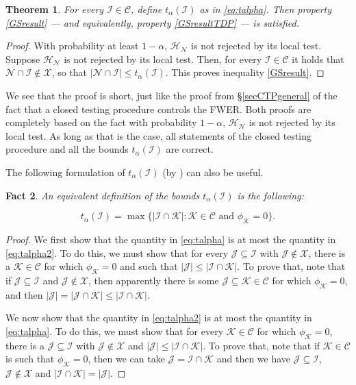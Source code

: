 \documentclass[11pt]{article}
\theoremstyle{plain}
\newtheorem{theorem}{Theorem}[section]
\newtheorem{fact}[theorem]{Fact}
\theoremstyle{definition}
\newcommand{\N}{\mathcal{N}}
\newcommand{\K}{\mathcal{K}}
\newcommand{\I}{\mathcal{I}}
\newcommand{\J}{\mathcal{J}}
\newcommand{\X}{\mathcal{X}}
\newcommand{\C}{\mathcal{C}}
\newcommand{\Hy}{\mathcal{H}}
\begin{document}
\begin{theorem}\label{thmsimCTPbounds}
For every $\I\in \C$, define $t_{\alpha}(\I)$ as in \eqref{eq:talpha}. Then property \eqref{GSresult} --- and equivalently, property \eqref{GSresultTDP} --- is satisfied.
\end{theorem}
\begin{proof}
With probability at least $1-\alpha$, $\Hy_{\N}$ is not rejected by its local test. Suppose $\Hy_{\N}$ is not rejected by its local test. Then,  for every $\I \in \C$ it holds that $\N\cap \I\not\in \X$, so that $|\N\cap \I| \leq t_{\alpha}(\I)$. This proves inequality \eqref{GSresult}.
\end{proof}
We see that the proof is  short, just like the proof from \S\ref{secCTPgeneral} of the fact that a closed testing procedure controls the FWER. Both proofs are completely based on the fact with probability $1-\alpha$, $\Hy_{\N}$ is not rejected by its local test. As long as that is the case, all statements of the closed testing procedure and all the bounds $t_{\alpha}(\I)$ are correct. 

The following formulation of $t_{\alpha}(\I)$ (by \citealp{genovese2006exceedance}) can also be useful.

\begin{fact} \label{altformtalpha}
An equivalent  definition of the bounds $t_{\alpha}(\I)$ is the following:
\end{fact}
\vspace{-0.4cm}
\begin{equation} \label{eq:talpha2} 
t_{\alpha}(\I)=\max\{|\I\cap \K|: \K\in\C  \text{ and }\phi_{\K}=0\}.
\end{equation}
\begin{proof}
We first show that the quantity in    \eqref{eq:talpha} is at most the quantity in    \eqref{eq:talpha2}. To do this, we must show that for every $ \J \subseteq \I$ with $ \J\not\in \X$, there is a $\K\in \C$ for which $\phi_{\K}=0$ and such that $|\J|  \leq  |\I\cap \K|$.
To prove that, note that if $ \J \subseteq \I$ and $ \J\not\in \X$, then apparently there is some $ \J\subseteq \K\in \C$ for which $\phi_{\K}=0$, and then $|\J| =|\J\cap \K| \leq  |\I\cap \K|$. 

We now  show that the quantity in    \eqref{eq:talpha2} is at most the quantity in    \eqref{eq:talpha}.
To do this, we must show that for every $\K\in \C$ for which $\phi_{\K}=0$, there is a $ \J \subseteq \I$ with $ \J\not\in \X$ and $|\J|  \leq  |\I\cap \K|$.
To prove that, note that if $\K\in \C$ is such that $\phi_{\K}=0$, then we can take $\J=\I\cap \K$ and then we have $\J\subseteq\I$, $\J\not\in \X$ and $|\I\cap\K|= |\J|$.
\end{proof}
\end{document}
